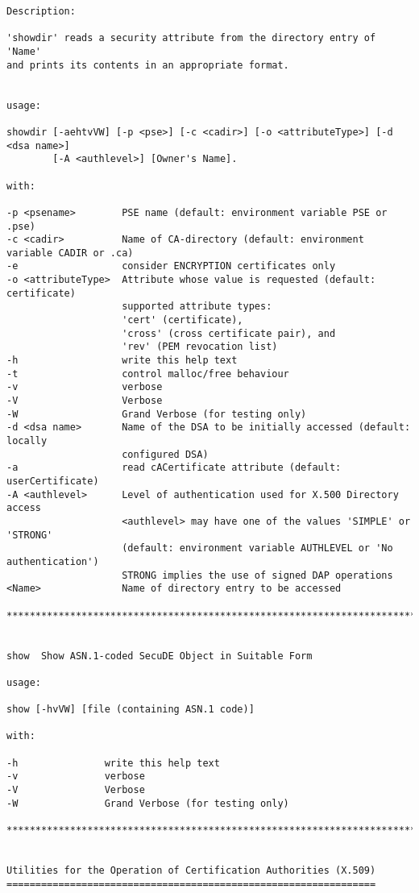{\begin{verbatim}
Description:

'showdir' reads a security attribute from the directory entry of 'Name'
and prints its contents in an appropriate format.


usage:

showdir [-aehtvVW] [-p <pse>] [-c <cadir>] [-o <attributeType>] [-d <dsa name>] 
        [-A <authlevel>] [Owner's Name].

with:

-p <psename>        PSE name (default: environment variable PSE or .pse)
-c <cadir>          Name of CA-directory (default: environment variable CADIR or .ca)
-e                  consider ENCRYPTION certificates only
-o <attributeType>  Attribute whose value is requested (default: certificate)
                    supported attribute types:
                    'cert' (certificate),
                    'cross' (cross certificate pair), and
                    'rev' (PEM revocation list)
-h                  write this help text
-t                  control malloc/free behaviour
-v                  verbose
-V                  Verbose
-W                  Grand Verbose (for testing only)
-d <dsa name>       Name of the DSA to be initially accessed (default: locally
                    configured DSA)
-a                  read cACertificate attribute (default: userCertificate)
-A <authlevel>      Level of authentication used for X.500 Directory access
                    <authlevel> may have one of the values 'SIMPLE' or 'STRONG'
                    (default: environment variable AUTHLEVEL or 'No authentication')
                    STRONG implies the use of signed DAP operations
<Name>              Name of directory entry to be accessed

****************************************************************************************


show  Show ASN.1-coded SecuDE Object in Suitable Form

usage:

show [-hvVW] [file (containing ASN.1 code)]

with:

-h               write this help text
-v               verbose
-V               Verbose
-W               Grand Verbose (for testing only)

****************************************************************************************


Utilities for the Operation of Certification Authorities (X.509)
================================================================



\end{verbatim}}
